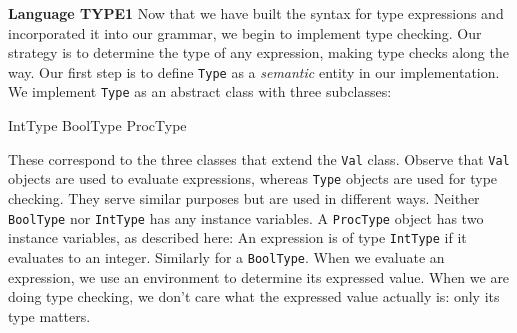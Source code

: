 \begin{minipage}[t]{\sw}
\slidenumber
\LARGE
{\bf Language TYPE1}\exx
\Large
Now that we have built the syntax for type expressions
and incorporated it into our grammar,
we begin to implement type checking.
Our strategy is to determine the type of any expression,
making type checks along the way.\exx
Our first step is to define \verb'Type'
as a {\em semantic} entity in our implementation.
We implement \verb'Type' as an abstract class
with three subclasses:
\begin{qv}
IntType
BoolType
ProcType
\end{qv}
These correspond to the three classes
that extend the \verb'Val' class.
Observe that \verb'Val' objects are used to evaluate expressions,
whereas \verb'Type' objects are used for type checking.
They serve similar purposes but are used in different ways.\exx
Neither \verb'BoolType' nor \verb'IntType' has any instance variables.
A \verb'ProcType' object has two instance variables,
as described here:\exx
\emm{}\exx
An expression is of type \verb'IntType'
if it evaluates to an integer.
Similarly for a \verb'BoolType'.\exx
When we evaluate an expression,
we use an environment to determine its expressed value.
When we are doing type checking,
we don't care what the expressed value actually is:
only its type matters.
\end{minipage}
